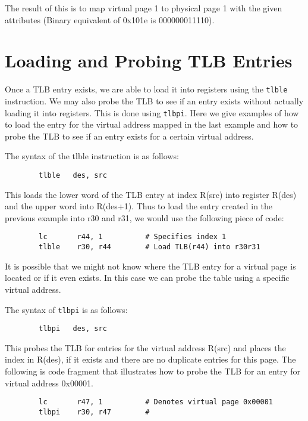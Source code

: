 The result of this is to map virtual page 1 to physical page 1 with 
the given attributes (Binary equivalent of 0x101e is 000000011110).   


\section{Loading and Probing TLB Entries}

Once a TLB entry exists, we are able to load it into registers using the
{\tt tlble} instruction. We may also probe the TLB to see if an entry exists 
without actually loading it into registers. This is done using {\tt tlbpi}. Here 
we give examples of how to load the entry for the virtual address mapped
in the last example and how to probe the TLB to see if an entry
exists for a certain virtual address. 

The syntax of the tlble instruction is as follows:

\begin{verbatim}
        tlble	des, src
\end{verbatim}

This loads the lower word of the TLB entry at index R(src) into 
register R(des) and the upper word into R(des+1). Thus to load the 
entry created in the previous example into r30 and r31, we would
use the following piece of code:

{\small
\begin{verbatim}
        lc       r44, 1          # Specifies index 1
        tlble    r30, r44        # Load TLB(r44) into r30r31	
\end{verbatim}}

It is possible that we might not know where the TLB entry 
for a virtual page is located or if it even exists. In this
case we can probe the table using a specific virtual address.

The syntax of {\tt tlbpi} is as follows:

\begin{verbatim}
        tlbpi	des, src
\end{verbatim}

This probes the TLB for entries for the virtual address
R(src) and places the index in R(des), if it exists and
there are no duplicate entries for this page. The following
is code fragment that illustrates how to probe the TLB for an entry 
for virtual address 0x00001.

{\small
\begin{verbatim}
        lc       r47, 1          # Denotes virtual page 0x00001
        tlbpi    r30, r47        # 
\end{verbatim}}


